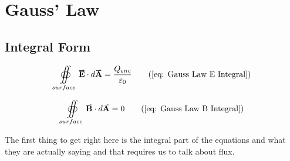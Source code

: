 \documentclass[main.tex]{subfiles}
\begin{document}
        \newpage
        \section{Gauss' Law}
            \label{sec: Gauss Law}
            \subsection{Integral Form}

                \begin{equation*}
                    \oiint\limits_{surface} \vect{E} \cdot d\vect{A} = \frac{Q_{enc}}{\varepsilon_0} \tag{\eqnum{eq: Gauss Law E Integral}}
                \end{equation*}

                \begin{equation*}
                    \oiint\limits_{surface} \vect{B} \cdot d\vect{A} = 0 \tag{\eqnum{eq: Gauss Law B Integral}}
                \end{equation*}

                The first thing to get right here is the integral part of the equations and what they are actually saying and that requires us to talk about flux.

            
\end{document}
